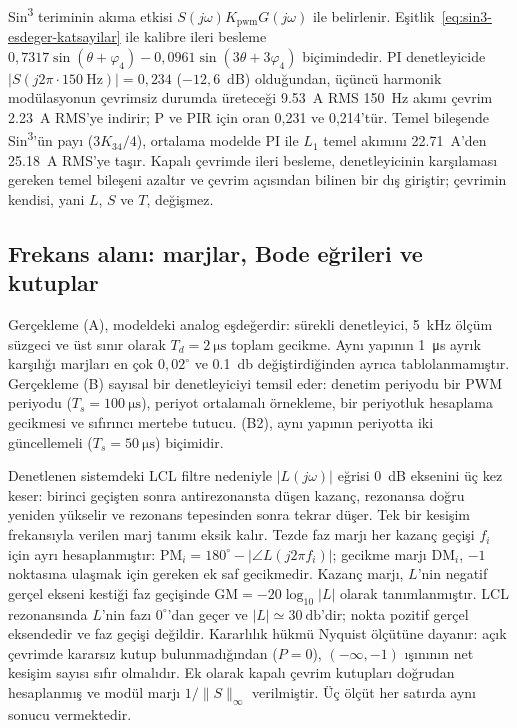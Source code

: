 Sin\textsuperscript{3} teriminin akıma etkisi $S(j\omega)K_{\mathrm{pwm}}G(j\omega)$ ile belirlenir. Eşitlik~\eqref{eq:sin3-esdeger-katsayilar} ile kalibre ileri besleme $0{,}7317\sin(\theta+\varphi_4)-0{,}0961\sin(3\theta+3\varphi_4)$ biçimindedir. PI denetleyicide $|S(j2\pi\cdot\SI{150}{\hertz})|=0{,}234$ ($-12{,}6$~dB) olduğundan, üçüncü harmonik modülasyonun çevrimsiz durumda üreteceği \SI{9.53}{\ampere} RMS \SI{150}{\hertz} akımı çevrim \SI{2.23}{\ampere} RMS'ye indirir; P ve PIR için oran 0,231 ve 0,214'tür. Temel bileşende Sin\textsuperscript{3}'ün payı ($3K_{34}/4$), ortalama modelde PI ile $L_1$ temel akımını \SI{22.71}{\ampere}'den \SI{25.18}{\ampere} RMS'ye taşır. Kapalı çevrimde ileri besleme, denetleyicinin karşılaması gereken temel bileşeni azaltır ve çevrim açısından bilinen bir dış giriştir; çevrimin kendisi, yani $L$, $S$ ve $T$, değişmez.

\subsection{Frekans alanı: marjlar, Bode eğrileri ve kutuplar}

Gerçekleme (A), modeldeki analog eşdeğerdir: sürekli denetleyici, \SI{5}{\kilo\hertz} ölçüm süzgeci ve üst sınır olarak $T_d=\SI{2}{\micro\second}$ toplam gecikme. Aynı yapının \SI{1}{\micro\second} ayrık karşılığı marjları en çok $0{,}02^{\circ}$ ve \SI{0.1}{\decibel} değiştirdiğinden ayrıca tablolanmamıştır. Gerçekleme (B) sayısal bir denetleyiciyi temsil eder: denetim periyodu bir PWM periyodu ($T_s=\SI{100}{\micro\second}$), periyot ortalamalı örnekleme, bir periyotluk hesaplama gecikmesi ve sıfırıncı mertebe tutucu. (B2), aynı yapının periyotta iki güncellemeli ($T_s=\SI{50}{\micro\second}$) biçimidir.

Denetlenen sistemdeki LCL filtre nedeniyle $|L(j\omega)|$ eğrisi 0~dB eksenini üç kez keser: birinci geçişten sonra antirezonansta düşen kazanç, rezonansa doğru yeniden yükselir ve rezonans tepesinden sonra tekrar düşer. Tek bir kesişim frekansıyla verilen marj tanımı eksik kalır. Tezde faz marjı her kazanç geçişi $f_i$ için ayrı hesaplanmıştır: $\mathrm{PM}_i=180^{\circ}-|\angle L(j2\pi f_i)|$; gecikme marjı $\mathrm{DM}_i$, $-1$ noktasına ulaşmak için gereken ek saf gecikmedir. Kazanç marjı, $L$'nin negatif gerçel ekseni kestiği faz geçişinde $\mathrm{GM}=-20\log_{10}|L|$ olarak tanımlanmıştır. LCL rezonansında $L$'nin fazı $0^{\circ}$'dan geçer ve $|L|\simeq\SI{30}{\decibel}$'dir; nokta pozitif gerçel eksendedir ve faz geçişi değildir. Kararlılık hükmü Nyquist ölçütüne dayanır: açık çevrimde kararsız kutup bulunmadığından ($P=0$), $(-\infty,-1)$ ışınının net kesişim sayısı sıfır olmalıdır. Ek olarak kapalı çevrim kutupları doğrudan hesaplanmış ve modül marjı $1/\|S\|_\infty$ verilmiştir. Üç ölçüt her satırda aynı sonucu vermektedir.


